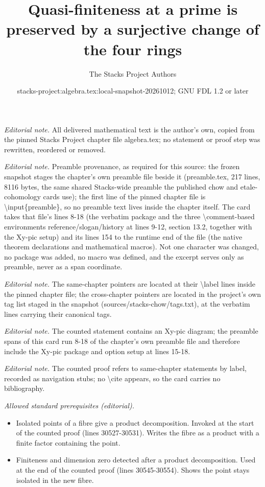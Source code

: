 \documentclass[10pt,a4paper]{amsart}
\title{Quasi-finiteness at a prime is preserved by a surjective change of the four rings}
\author{The Stacks Project Authors}
\date{stacks-project:algebra.tex:local-snapshot-20261012; GNU FDL 1.2 or later}
\theoremstyle{plain}
\theoremstyle{definition}
\theoremstyle{remark}
\numberwithin{equation}{subsection}
\begin{document}
\maketitle
\noindent\textit{Editorial note.} All delivered mathematical text is the author's own, copied from the pinned Stacks Project chapter file algebra.tex; no statement or proof step was rewritten, reordered or removed.\par\medskip
\noindent\textit{Editorial note.} Preamble provenance, as required for this source: the frozen snapshot stages the chapter's own preamble file beside it (preamble.tex, 217 lines, 8116 bytes, the same shared Stacks-wide preamble the published chow and etale-cohomology cards use); the first line of the pinned chapter file is \textbackslash{}input\{preamble\}, so no preamble text lives inside the chapter itself. The card takes that file's lines 8-18 (the verbatim package and the three \textbackslash{}comment-based environments reference/slogan/history at lines 9-12, section 13.2, together with the Xy-pic setup) and its lines 154 to the runtime end of the file (the native theorem declarations and mathematical macros). Not one character was changed, no package was added, no macro was defined, and the excerpt serves only as preamble, never as a span coordinate.\par\medskip
\noindent\textit{Editorial note.} The same-chapter pointers are located at their \textbackslash{}label lines inside the pinned chapter file; the cross-chapter pointers are located in the project's own tag list staged in the snapshot (sources/stacks-chow/tags.txt), at the verbatim lines carrying their canonical tags.\par\medskip
\noindent\textit{Editorial note.} The counted statement contains an Xy-pic diagram; the preamble spans of this card run 8-18 of the chapter's own preamble file and therefore include the Xy-pic package and option setup at lines 15-18.\par\medskip
\noindent\textit{Editorial note.} The counted proof refers to same-chapter statements by label, recorded as navigation stubs; no \textbackslash{}cite appears, so the card carries no bibliography.\par\medskip
\noindent\textit{Allowed standard prerequisites (editorial).}\begin{itemize}
\item Isolated points of a fibre give a product decomposition. Invoked at the start of the counted proof (lines 30527-30531). Writes the fibre as a product with a finite factor containing the point.
\item Finiteness and dimension zero detected after a product decomposition. Used at the end of the counted proof (lines 30545-30554). Shows the point stays isolated in the new fibre.
\end{itemize}\medskip
\end{document}
